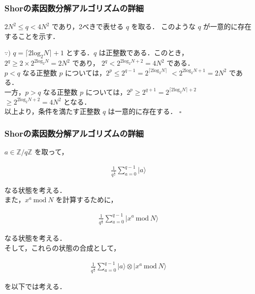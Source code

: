 \documentclass[dvipdfmx,12pt]{beamer}
\begin{document}
\begin{frame}

\frametitle{Shorの素因数分解アルゴリズムの詳細}
              
$ 2 N^2 \leq q < 4 N^2 $ であり，2べきで表せる $q$ を取る．
このような $q$ が一意的に存在することを示す． \\

\vspace{10pt}

$ \because) $ $ q = \lceil 2 \mathrm{log}_2 N \rceil + 1 $ とする．$ q $ は正整数である．このとき， \\
$ 2^q \geq 2 \times 2^{2 \mathrm{log}_2 N} = 2 N^2 $ であり，
$ 2^q < 2^{2 \mathrm{log}_2 N + 2} = 4 N^2 $ である． \\
$ p < q $ なる正整数 $p$ については，$ 2^p \leq 2^{q - 1} = 2^{\lceil 2 \mathrm{log}_2 N \rceil} $ $ < 2^{2 \mathrm{log}_2 N + 1} = 2N^2 $ である．\\
一方，$ p > q $ なる正整数 $p$ については，$ 2^p \geq 2^{q + 1} = 2^{\lceil 2 \mathrm{log}_2 N \rceil + 2} $  $ \geq 2^{ 2 \mathrm{log}_2 N + 2} = 4 N^2 $ となる．\\         
以上より，条件を満たす正整数 $q$ は一意的に存在する． \hspace{\fill} $ \square $

\end{frame}


\begin{frame}

\frametitle{Shorの素因数分解アルゴリズムの詳細}

$ a \in \mathbb{Z} / q \mathbb{Z} $ を取って， \vspace{-25pt}

\begin{align*}
    \displaystyle \frac{1}{q^{\frac{1}{2}}} \sum_{a = 0}^{q - 1} |a \rangle
\end{align*}

なる状態を考える．\\
また，$ x^a \ \mathrm{mod} \ N $ を計算するために，\vspace{-25pt}

\begin{align*}
    \displaystyle \frac{1}{q^{\frac{1}{2}}} \sum_{a = 0}^{q - 1} |x^a \ \mathrm{mod} \ N \rangle
\end{align*}

なる状態を考える． \\
そして，これらの状態の合成として， \vspace{-25pt}

\begin{align*}
    \displaystyle \frac{1}{q^{\frac{1}{2}}} \sum_{a = 0}^{q - 1} |a \rangle \otimes |x^a \ \mathrm{mod} \ N \rangle
\end{align*}

を以下では考える．

\end{frame}
\end{document}

